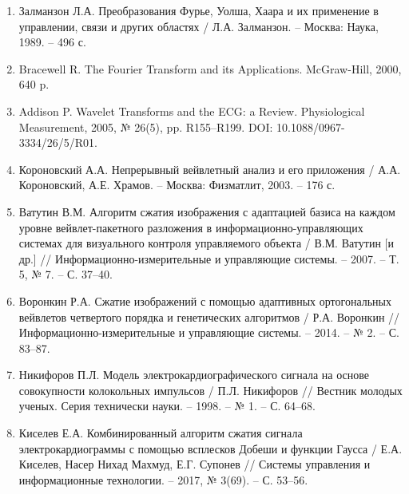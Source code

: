 \documentclass[11pt, oneside, a4paper]{article}
\begin{document}
\begin{enumerate} 
\item Залманзон Л.А. Преобразования Фурье, Уолша, Хаара и их применение в управлении, связи и других областях / Л.А. Залманзон. – Москва: Наука, 1989. – 496 с.
\item Bracewell R. The Fourier Transform and its Applications. McGraw-Hill, 2000, 640 p.
\item Addison P. Wavelet Transforms and the ECG: a Review. Physiological Measurement, 2005, № 26(5), pp. R155–R199. DOI: 10.1088/0967-3334/26/5/R01.
\item Короновский А.А. Непрерывный вейвлетный анализ и его приложения / А.А. Короновский, А.Е. Храмов. – Москва: Физматлит, 2003. – 176 с.
\item Ватутин В.М. Алгоритм сжатия изображения с адаптацией базиса на каждом уровне вейвлет-пакетного разложения в информационно-управляющих системах для визуального контроля управляемого объекта / В.М. Ватутин [и др.] // Информационно-измерительные и управляющие системы. – 2007. – Т. 5, № 7. – С. 37–40.
\item Воронкин Р.А. Сжатие изображений с помощью адаптивных ортогональных вейвлетов четвертого порядка и генетических алгоритмов / Р.А. Воронкин // Информационно-измерительные и управляющие системы. – 2014. – № 2. – С. 83–87.
\item Никифоров П.Л. Модель электрокардиографического сигнала на основе совокупности колокольных импульсов / П.Л. Никифоров // Вестник молодых ученых. Серия технически науки. – 1998. – № 1. – С. 64–68.
\item Киселев Е.А. Комбинированный алгоритм сжатия сигнала электрокардиограммы с помощью всплесков Добеши и функции Гаусса / Е.А. Киселев, Насер Нихад Махмуд, Е.Г. Супонев // Системы управления и информационные технологии. – 2017, № 3(69). – С. 53–56.

\end{enumerate}
\end{document}
